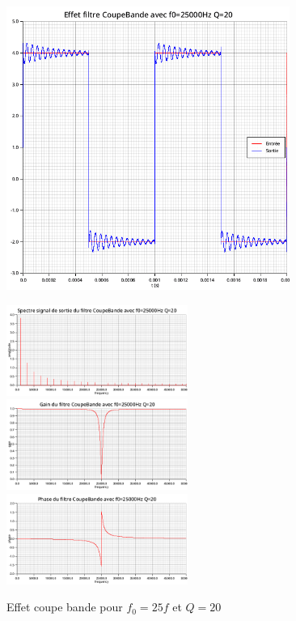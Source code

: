 \documentclass{article}
\begin{document}
\begin{figure}[H]
  \begin{minipage}{0.6\textwidth}
      \centering
      \includegraphics[width=25em]{images/creneau/rejecteur/q=20/25/signals.png}
  \end{minipage}
  \begin{minipage}{0.3\textwidth}
      \centering
      \includegraphics[width=16em]{images/creneau/rejecteur/q=20/25/fft_out.png}
      \vfill
      \includegraphics[width=16em]{images/creneau/rejecteur/q=20/25/gain.png}
      \vfill
      \includegraphics[width=16em]{images/creneau/rejecteur/q=20/25/phase.png}
  \end{minipage}
  \caption{Effet coupe bande pour $f_0=25f$ et $Q=20$}
\end{figure}
\end{document}
